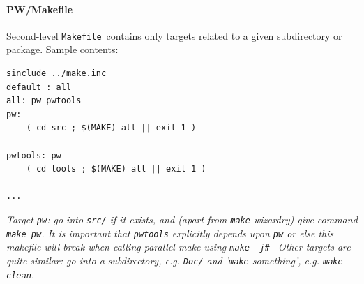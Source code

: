 \documentclass[12pt,a4paper]{article}
\def\Makefile{\texttt{Makefile}}
\begin{document}
\paragraph{PW/Makefile}
Second-level \Makefile\ contains only targets related to a given
subdirectory or package. Sample contents:
\begin{verbatim}
sinclude ../make.inc
default : all
all: pw pwtools
pw:
    ( cd src ; $(MAKE) all || exit 1 )

pwtools: pw
    ( cd tools ; $(MAKE) all || exit 1 )

...
\end{verbatim}
{\em Target {\tt pw}: go into {\tt src/} if it exists, and (apart
from \texttt{make} wizardry) give command {\tt make pw}. It is important
that {\tt pwtools} explicitly depends upon {\tt pw} or else this
makefile will break when calling parallel make using {\tt make -j\# }
Other targets are quite similar: go into a subdirectory, e.g.
{\tt Doc/} and '{\tt make} something', e.g. {\tt make clean}.}
\end{document}
